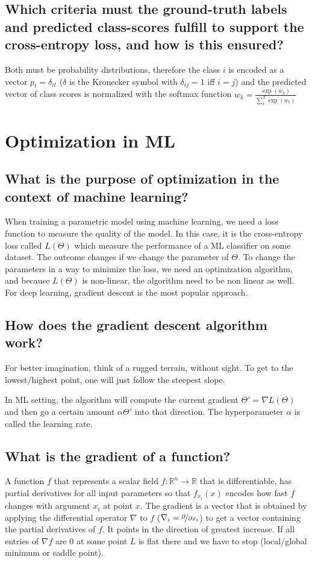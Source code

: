 \subsection{Which criteria must the ground-truth labels and predicted class-scores fulfill to support the cross-entropy loss, and how is this ensured?}
Both must be probability distributions, therefore the class $i$ is encoded as a vector $p_t = \delta_{it}$ ($\delta$ is the Kronecker symbol with $\delta_{ij} = 1$ iff $i = j$) and the predicted vector of class scores is normalized with the softmax function $w_k =  \frac{\exp(w_k)}{\sum_t^T \exp(w_t)}$

\section{Optimization in ML}
\subsection{What is the purpose of optimization in the context of machine learning?}

When training a parametric model using machine learning, we need a loss function to measure the quality of the model. In this case, it is the cross-entropy loss called $L(\Theta)$ which measure the performance of a ML classifier on some dataset. The outcome changes if we change the parameter of $\Theta$. To change the parameters in a way to minimize the loss, we need an optimization algorithm, and because $L(\Theta)$ is non-linear, the algorithm need to be non linear as well. For deep learning, gradient descent is the most popular approach.

\subsection{How does the gradient descent algorithm work?}
For better imagination, think of a rugged terrain, without sight. To get to the lowest/highest point, one will just follow the steepest slope. 

In  ML setting, the algorithm will compute the current gradient $\Theta' = \nabla L(\Theta)$ and then go a certain amount $\alpha\Theta'$ into that direction. The hyperparameter $\alpha$ is called the learning rate.
\subsection{What is the gradient of a function? }
A function $f$ that represents a scalar field $f: \mathbb R^n \to \mathbb R$ that is differentiable, has partial derivatives for all input parameters so that $f_{x_i}(x)$ encodes how fast $f$ changes with argument $x_i$ at point $x$.  The gradient is a vector that is obtained by applying the differential operator $\nabla$ to $f$ ($\nabla_i = \nicefrac{\partial}{\partial x_i}$) to get a vector containing the partial derivatives of $f$. It points in the direction of greatest increase. If all entries of $\nabla f$ are $0$ at some point $L$ is flat there and we have to stop (local/global minimum or saddle point).

